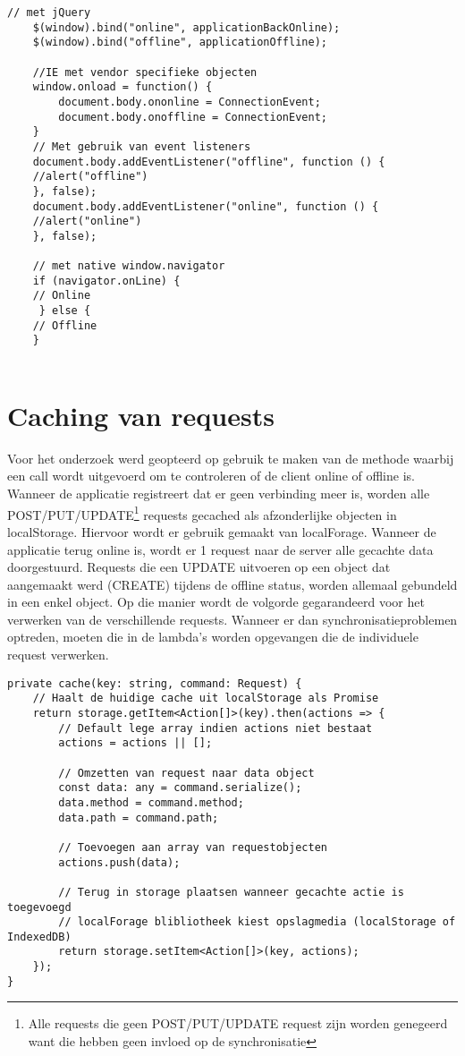 \begin{lstlisting}[caption=Verschillende methodes\autocite{offline-online-examples} voor controleren offline en online status.]
    // met jQuery
    $(window).bind("online", applicationBackOnline); 
    $(window).bind("offline", applicationOffline);

    //IE met vendor specifieke objecten
    window.onload = function() {
        document.body.ononline = ConnectionEvent;
        document.body.onoffline = ConnectionEvent;
    }
    // Met gebruik van event listeners
    document.body.addEventListener("offline", function () {
    //alert("offline")
    }, false);
    document.body.addEventListener("online", function () {
    //alert("online")
    }, false);
    
    // met native window.navigator
    if (navigator.onLine) {
  	// Online
     } else {
  	// Offline
	}
    
\end{lstlisting}
\clearpage
\section{Caching van requests}
Voor het onderzoek werd geopteerd op gebruik te maken van de methode waarbij een call wordt uitgevoerd om te controleren of de client online of offline is. Wanneer de applicatie registreert dat er geen verbinding meer is, worden alle POST/PUT/UPDATE\footnote{Alle requests die geen POST/PUT/UPDATE request zijn worden genegeerd want die hebben geen invloed op de synchronisatie} requests gecached als afzonderlijke objecten in localStorage. Hiervoor wordt er gebruik gemaakt van localForage. Wanneer de applicatie terug online is, wordt er 1 request naar de server alle gecachte data doorgestuurd. Requests die een UPDATE uitvoeren op een object dat aangemaakt werd (CREATE) tijdens de offline status, worden allemaal gebundeld in een enkel object. Op die manier wordt de volgorde gegarandeerd voor het verwerken van de verschillende requests. Wanneer er dan synchronisatieproblemen optreden, moeten die in de lambda's worden opgevangen die de individuele request verwerken.

\begin{lstlisting}[caption=Caching van een request]
private cache(key: string, command: Request) {
	// Haalt de huidige cache uit localStorage als Promise
	return storage.getItem<Action[]>(key).then(actions => {
		// Default lege array indien actions niet bestaat
		actions = actions || [];
	
		// Omzetten van request naar data object
		const data: any = command.serialize();
		data.method = command.method;
		data.path = command.path;
		
		// Toevoegen aan array van requestobjecten
		actions.push(data);
		
		// Terug in storage plaatsen wanneer gecachte actie is toegevoegd
		// localForage blibliotheek kiest opslagmedia (localStorage of IndexedDB)
		return storage.setItem<Action[]>(key, actions);
	});
}
\end{lstlisting}

